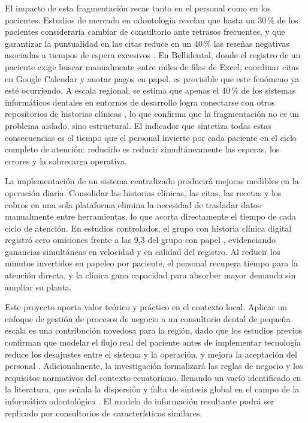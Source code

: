 El impacto de esta fragmentación recae tanto en el personal como en los
pacientes. Estudios de mercado en odontología revelan que hasta un 30\,\%
de los pacientes consideraría cambiar de consultorio ante retrasos
frecuentes, y que garantizar la puntualidad en las citas reduce en un
40\,\% las reseñas negativas asociadas a tiempos de espera excesivos
\cite{Minh2026WaitTimeDental}. En Bellidental, donde el registro de un
paciente exige buscar manualmente entre miles de filas de Excel, coordinar
citas en Google Calendar y anotar pagos en papel, es previsible que este
fenómeno ya esté ocurriendo. A escala regional, se estima que apenas el
40\,\% de los sistemas informáticos dentales en entornos de desarrollo
logra conectarse con otros repositorios de historias clínicas
\cite{Sravya2024EHRDentistry}, lo que confirma que la fragmentación no
es un problema aislado, sino estructural. El indicador que sintetiza todas
estas consecuencias es el tiempo que el personal invierte por cada
paciente en el ciclo completo de atención: reducirlo es reducir
simultáneamente las esperas, los errores y la sobrecarga operativa.

La implementación de un sistema centralizado producirá mejoras medibles
en la operación diaria. Consolidar las historias clínicas, las citas, las
recetas y los cobros en una sola plataforma elimina la necesidad de
trasladar datos manualmente entre herramientas, lo que acorta directamente
el tiempo de cada ciclo de atención. En estudios controlados, el grupo
con historia clínica digital registró cero omisiones frente a las 9,3
del grupo con papel \cite{pmc2024digital}, evidenciando ganancias
simultáneas en velocidad y en calidad del registro. Al reducir los minutos
invertidos en papeleo por paciente, el personal recupera tiempo para
la atención directa, y la clínica gana capacidad para absorber mayor
demanda sin ampliar su planta.

Este proyecto aporta valor teórico y práctico en el contexto local.
Aplicar un enfoque de gestión de procesos de negocio a un consultorio
dental de pequeña escala es una contribución novedosa para la región,
dado que los estudios previos confirman que modelar el flujo real del
paciente antes de implementar tecnología reduce los desajustes entre el
sistema y la operación, y mejora la aceptación del personal
\cite{makerere2024business}. Adicionalmente, la investigación formalizará
las reglas de negocio y los requisitos normativos del contexto ecuatoriano,
llenando un vacío identificado en la literatura, que señala la dispersión
y falta de síntesis global en el campo de la informática odontológica
\cite{Sravya2024EHRDentistry}. El modelo de información resultante podrá
ser replicado por consultorios de características similares.

